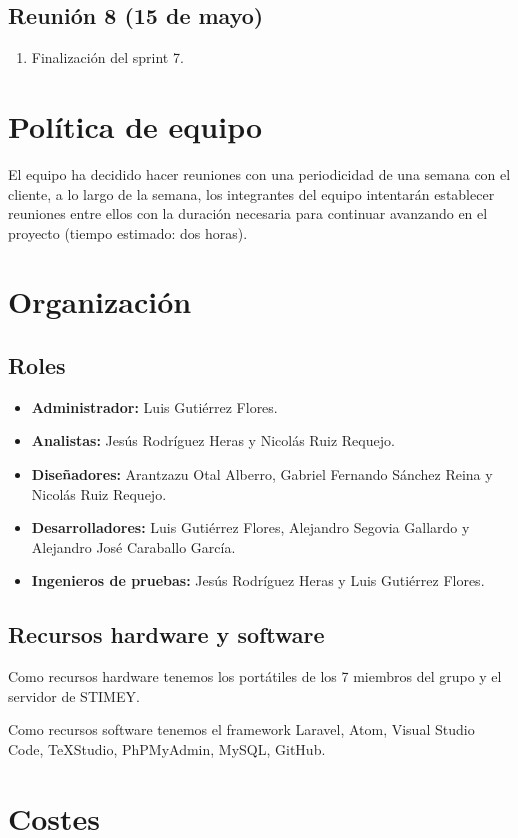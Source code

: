 \subsection{Reunión 8 (15 de mayo)}
\begin{enumerate}
	\item Finalización del sprint 7.
\end{enumerate}

\section{Política de equipo}
El equipo ha decidido hacer reuniones con una periodicidad de una semana con el cliente, a lo largo de la semana, los integrantes del equipo intentarán establecer reuniones entre ellos con la duración necesaria para continuar avanzando en el proyecto (tiempo estimado: dos horas).

\section{Organización}
\subsection{Roles}
\begin{itemize}
	\item \textbf{Administrador:} Luis Gutiérrez Flores.
	\item \textbf{Analistas:} Jesús Rodríguez Heras y Nicolás Ruiz Requejo.
	\item \textbf{Diseñadores:} Arantzazu Otal Alberro, Gabriel Fernando Sánchez Reina y Nicolás Ruiz Requejo.
	\item \textbf{Desarrolladores:} Luis Gutiérrez Flores, Alejandro Segovia Gallardo y Alejandro José Caraballo García.
	\item \textbf{Ingenieros de pruebas:} Jesús Rodríguez Heras y Luis Gutiérrez Flores.
\end{itemize}

\subsection{Recursos hardware y software}
Como recursos hardware tenemos los portátiles de los 7 miembros del grupo y el servidor de STIMEY.

Como recursos software tenemos el framework Laravel, Atom, Visual Studio Code, TeXStudio, PhPMyAdmin, MySQL, GitHub.

\section{Costes}
